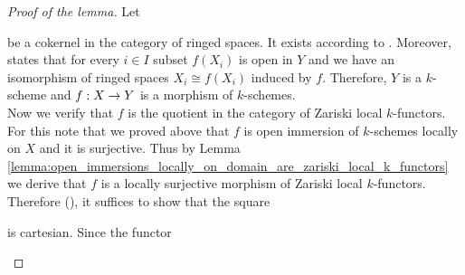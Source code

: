 \begin{proof}[Proof of the lemma]
Let
\begin{center}
\end{center}
be a cokernel in the category of ringed spaces. It exists according to {\cite[Remark 2.3]{LocallyRingedSpaces}}. Moreover, {\cite[Theorem 3.2]{LocallyRingedSpaces}} states that for every $i\in I$ subset $f(X_i)$ is open in $Y$ and we have an isomorphism of ringed spaces $X_i\cong f(X_i)$ induced by $f$. Therefore, $Y$ is a $k$-scheme and $f:X\rightarrow Y$ is a morphism of $k$-schemes.\\
Now we verify that $f$ is the quotient in the category of Zariski local $k$-functors. For this note that we proved above that $f$ is open immersion of $k$-schemes locally on $X$ and it is surjective. Thus by Lemma \ref{lemma:open_immersions_locally_on_domain_are_zariski_local_k_functors} we derive that $f$ is a locally surjective morphism of Zariski local $k$-functors. Therefore ({\cite[Theorem 7.3]{Sheaves}}), it suffices to show that the square
\begin{center}
\end{center}
is cartesian. Since the functor
\begin{center}
\end{center}
\end{proof}
